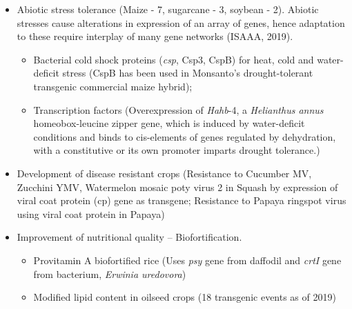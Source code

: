 \documentclass[
  ignorenonframetext,
  aspectratio=169]{beamer}
\providecommand{\tightlist}{%
  \setlength{\itemsep}{0pt}\setlength{\parskip}{0pt}}
\begin{document}
\begin{frame}{}
\protect\hypertarget{section-1}{}
\begin{itemize}
\tightlist
\item
  Abiotic stress tolerance (Maize - 7, sugarcane - 3, soybean - 2).
  Abiotic stresses cause alterations in expression of an array of genes,
  hence adaptation to these require interplay of many gene networks
  (ISAAA, 2019).

  \begin{itemize}
  \tightlist
  \item
    Bacterial cold shock proteins (\emph{csp}, Csp3, CspB) for heat,
    cold and water-deficit stress (CspB has been used in Monsanto's
    drought-tolerant transgenic commercial maize hybrid);
  \item
    Transcription factors (Overexpression of \emph{Hahb}-4, a
    \emph{Helianthus annus} homeobox-leucine zipper gene, which is
    induced by water-deficit conditions and binds to cis-elements of
    genes regulated by dehydration, with a constitutive or its own
    promoter imparts drought tolerance.)
  \end{itemize}
\item
  Development of disease resistant crops (Resistance to Cucumber MV,
  Zucchini YMV, Watermelon mosaic poty virus 2 in \alert{Squash} by
  expression of viral coat protein (cp) gene as transgene; Resistance to
  Papaya ringspot virus using viral coat protein in Papaya)
\item
  Improvement of nutritional quality -- Biofortification.

  \begin{itemize}
  \tightlist
  \item
    Provitamin A biofortified rice (Uses \emph{psy} gene from daffodil
    and \emph{crtI} gene from bacterium, \emph{Erwinia uredovora})
  \item
    Modified lipid content in oilseed crops (18 transgenic events as of
    2019)
  \end{itemize}
\end{itemize}
\end{frame}
\end{document}
